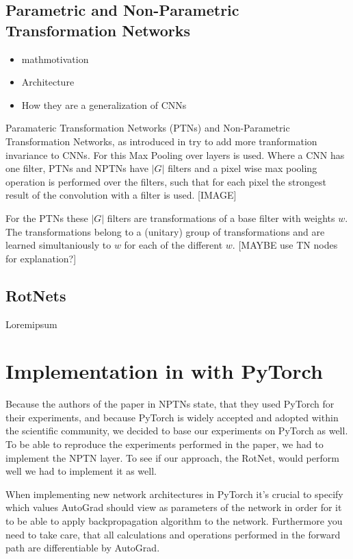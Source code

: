 \documentclass{llncs}
\begin{document}
\subsection{Parametric and Non-Parametric Transformation Networks}
\begin{itemize}
  \item	mathmotivation
  \item Architecture
  \item How they are a generalization of CNNs
\end{itemize}

Paramateric Transformation Networks (PTNs) and Non-Parametric Transformation Networks, as introduced in \cite{NPTN} try to add more tranformation invariance to CNNs. For this Max Pooling over layers is used. 
Where a CNN has one filter, PTNs and NPTNs have $|G|$ filters and a pixel wise max pooling operation is performed over the filters, such that for each pixel the strongest result of the convolution with a filter is used. [IMAGE]

For the PTNs these $|G|$ filters are transformations of a base filter with weights $w$. The transformations belong to a (unitary) group of transformations and are learned simultaniously to $w$ for each of the different $w$. [MAYBE use TN nodes for explanation?]



\subsection{RotNets}
Loremipsum

\section{Implementation in with PyTorch}
Because the authors of the paper in NPTNs state, that they used PyTorch for their experiments, and because PyTorch is widely accepted and adopted within the scientific community, we decided to base our experiments on PyTorch as well.
To be able to reproduce the experiments performed in the paper, we had to implement the NPTN layer. To see if our approach, the RotNet, would perform well we had to implement it as well.

When implementing new network architectures in PyTorch it's crucial to specify which values AutoGrad should view as parameters of the network in order for it to be able to apply backpropagation algorithm to the network. Furthermore you need to take care, that all calculations and operations performed in the forward path are differentiable by AutoGrad.
\end{document}
